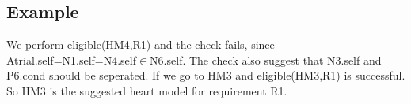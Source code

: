 \documentclass{llncs}
\begin{document}
\subsection{Example}
We perform \textsf{eligible(HM4,R1)} and the check fails, since \textsf{Atrial.self=N1.self=N4.self$\in$N6.self}. The check also suggest that \textsf{N3.self} and \textsf{P6.cond} should be seperated. If we go to HM3 and \textsf{eligible(HM3,R1)} is successful. So HM3 is the suggested heart model for requirement \textsf{R1}.


%

{ \small 

}
\end{document}
